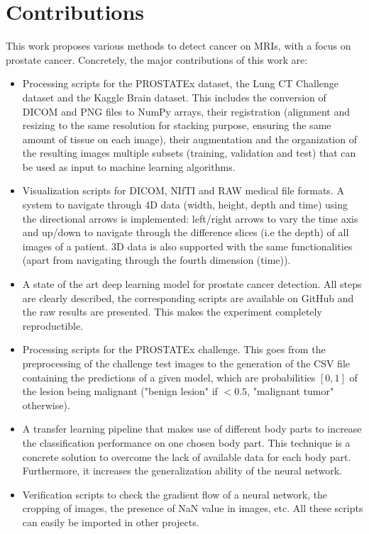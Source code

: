 \section{Contributions}
This work proposes various methods to detect cancer on MRIs, with a focus on prostate cancer. Concretely, the major contributions of this work are:
\begin{itemize}

\item Processing scripts for the PROSTATEx dataset, the Lung CT Challenge dataset and the Kaggle Brain dataset. This includes the conversion of DICOM and PNG files to NumPy arrays, their registration (alignment and resizing to the same resolution for stacking purpose, ensuring the same amount of tissue on each image), their augmentation and the organization of the resulting images multiple subsets (training, validation and test) that can be used as input to machine learning algorithms.

\item Visualization scripts for DICOM, NIfTI and RAW medical file formats. A system to navigate through 4D data (width, height, depth and time) using the directional arrows is implemented: left/right arrows to vary the time axis and up/down to navigate through the difference slices (i.e the depth) of all images of a patient. 3D data is also supported with the same functionalities (apart from navigating through the fourth dimension (time)). 

\item A state of the art deep learning model for prostate cancer detection. All steps are clearly described, the corresponding scripts are available on GitHub and the raw results are presented. This makes the experiment completely reproductible. 

\item Processing scripts for the PROSTATEx challenge. This goes from the preprocessing of the challenge test images to the generation of the CSV file containing the predictions of a given model, which are probabilities $[0,1]$ of the lesion being malignant ("benign lesion" if $< 0.5$, "malignant tumor" otherwise).

\item A transfer learning pipeline that makes use of different body parts to increase the classification performance on one chosen body part. This technique is a concrete solution to overcome the lack of available data for each body part. Furthermore, it increases the generalization ability of the neural network.

\item Verification scripts to check the gradient flow of a neural network, the cropping of images, the presence of NaN value in images, etc. All these scripts can easily be imported in other projects.
\end{itemize}
